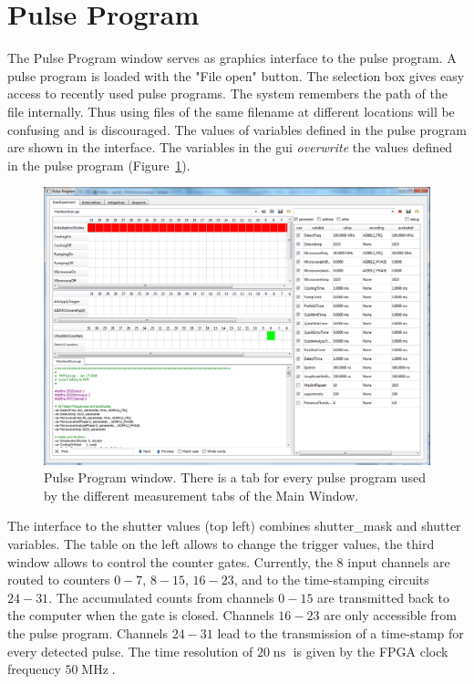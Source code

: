 \documentclass[11pt]{scrartcl}
\newcommand{\unit}[1]{\ensuremath{\operatorname{#1}}}
\begin{document}
\section{Pulse Program}
The Pulse Program window serves as graphics interface to the pulse program. A pulse program is loaded with the "File open" button. The selection box gives easy access to recently used pulse programs. The system remembers the path of the file internally. Thus using files of the same filename at different locations will be confusing and is discouraged. The values of variables defined in the pulse program are shown in the interface. The variables in the gui {\em overwrite} the values defined in the pulse program (Figure~\ref{PulseProgram}). 
\begin{figure}[htbp]
\begin{center}
\includegraphics[width=\textwidth]{PulseProgram}
\end{center}
\caption{\label{PulseProgram} Pulse Program window. There is a tab for every pulse program used by the different measurement tabs of the Main Window.}
\end{figure}

The interface to the shutter values (top left) combines shutter_mask and shutter variables. The table on the left allows to change the trigger values, the third window allows to control the counter gates.
Currently, the $8$ input channels are routed to counters $0-7$, $8-15$, $16-23$, and to the time-stamping circuits $24-31$.
The accumulated counts from channels $0-15$ are transmitted back to the computer when the gate is closed. Channels $16-23$ are only accessible from the pulse program. Channels $24-31$ lead to the transmission of a time-stamp for every detected pulse. The time resolution of $20\unit{ns}$ is given by the FPGA clock frequency $50\unit{MHz}$.
\end{document}
